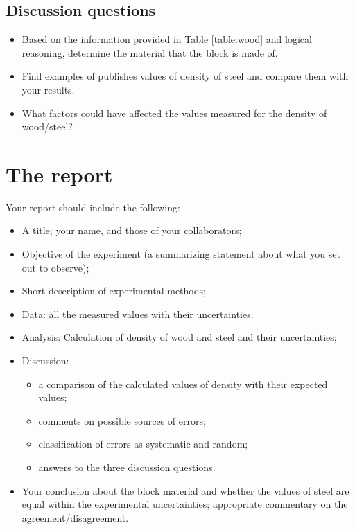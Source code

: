 \documentclass[justified]{tufte-handout}
\begin{document}
\subsection{Discussion questions}
\begin{itemize}
\item
Based on the information provided in Table \ref{table:wood} and logical reasoning, determine the material that the block is made of. 
\item
Find examples of publishes values of density of steel and compare them with your results.
\item
What factors could have affected the values measured for the density of wood/steel?

\end{itemize}
\section{The report}
Your report should include the following:
\begin{itemize}
\item
A title; your name, and those of your collaborators;
\item
Objective of the experiment (a summarizing statement about what you set out to observe);
\item Short description of experimental methods;
\item
Data: all the measured values with their uncertainties.
\item
Analysis: Calculation of density of wood and steel and their uncertainties;
\item
Discussion: 
\begin{itemize}
\item a comparison of the calculated values of density with their expected values;
\item comments on possible sources of errors;
\item classification of errors as systematic and random;
\item answers to the three discussion questions.
\end{itemize}
\item
Your conclusion about the block material and whether the values of steel are equal within the experimental uncertainties; appropriate commentary on the agreement/disagreement.
\end{itemize}
\end{document}
